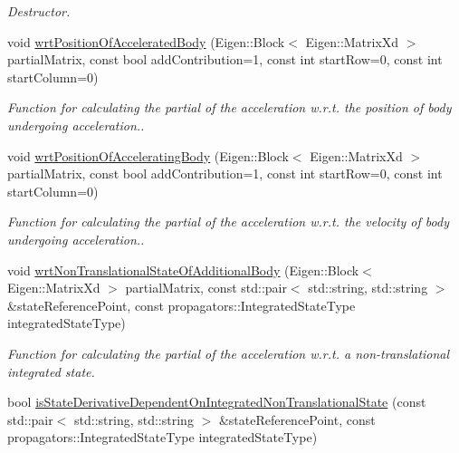 \begin{DoxyCompactItemize}
\begin{DoxyCompactList}\small\item\em Destructor. \end{DoxyCompactList}\item 
void \hyperlink{classtudat_1_1acceleration__partials_1_1CannonBallRadiationPressurePartial_a7105f4ca7565bc0b0ffe893755ee3b26}{wrt\+Position\+Of\+Accelerated\+Body} (Eigen\+::\+Block$<$ Eigen\+::\+Matrix\+Xd $>$ partial\+Matrix, const bool add\+Contribution=1, const int start\+Row=0, const int start\+Column=0)
\begin{DoxyCompactList}\small\item\em Function for calculating the partial of the acceleration w.\+r.\+t. the position of body undergoing acceleration.. \end{DoxyCompactList}\item 
void \hyperlink{classtudat_1_1acceleration__partials_1_1CannonBallRadiationPressurePartial_ac7c82002af8222d1de3cf7c2a5d37341}{wrt\+Position\+Of\+Accelerating\+Body} (Eigen\+::\+Block$<$ Eigen\+::\+Matrix\+Xd $>$ partial\+Matrix, const bool add\+Contribution=1, const int start\+Row=0, const int start\+Column=0)
\begin{DoxyCompactList}\small\item\em Function for calculating the partial of the acceleration w.\+r.\+t. the velocity of body undergoing acceleration.. \end{DoxyCompactList}\item 
void \hyperlink{classtudat_1_1acceleration__partials_1_1CannonBallRadiationPressurePartial_aba3d2b12b38f731700103f233ab655f6}{wrt\+Non\+Translational\+State\+Of\+Additional\+Body} (Eigen\+::\+Block$<$ Eigen\+::\+Matrix\+Xd $>$ partial\+Matrix, const std\+::pair$<$ std\+::string, std\+::string $>$ \&state\+Reference\+Point, const propagators\+::\+Integrated\+State\+Type integrated\+State\+Type)
\begin{DoxyCompactList}\small\item\em Function for calculating the partial of the acceleration w.\+r.\+t. a non-\/translational integrated state. \end{DoxyCompactList}\item 
bool \hyperlink{classtudat_1_1acceleration__partials_1_1CannonBallRadiationPressurePartial_afce5101fe0a206f110fda0917146bc9f}{is\+State\+Derivative\+Dependent\+On\+Integrated\+Non\+Translational\+State} (const std\+::pair$<$ std\+::string, std\+::string $>$ \&state\+Reference\+Point, const propagators\+::\+Integrated\+State\+Type integrated\+State\+Type)

\end{DoxyCompactItemize}
